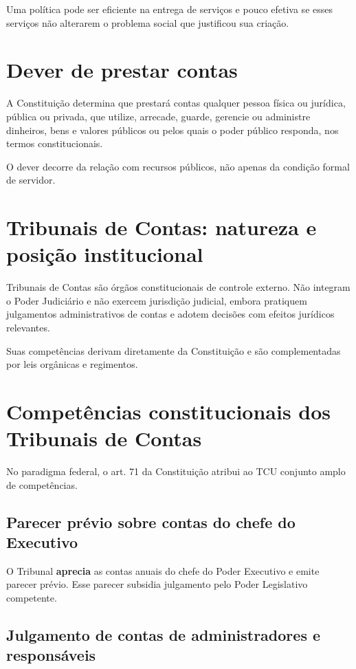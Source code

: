 Uma política pode ser eficiente na entrega de serviços e pouco efetiva se esses serviços não alterarem o problema social que justificou sua criação.

\section{Dever de prestar contas}

A Constituição determina que prestará contas qualquer pessoa física ou jurídica, pública ou privada, que utilize, arrecade, guarde, gerencie ou administre dinheiros, bens e valores públicos ou pelos quais o poder público responda, nos termos constitucionais.

O dever decorre da relação com recursos públicos, não apenas da condição formal de servidor.

\section{Tribunais de Contas: natureza e posição institucional}

Tribunais de Contas são órgãos constitucionais de controle externo. Não integram o Poder Judiciário e não exercem jurisdição judicial, embora pratiquem julgamentos administrativos de contas e adotem decisões com efeitos jurídicos relevantes.

Suas competências derivam diretamente da Constituição e são complementadas por leis orgânicas e regimentos.

\section{Competências constitucionais dos Tribunais de Contas}

No paradigma federal, o art. 71 da Constituição atribui ao TCU conjunto amplo de competências.

\subsection{Parecer prévio sobre contas do chefe do Executivo}

O Tribunal \textbf{aprecia} as contas anuais do chefe do Poder Executivo e emite parecer prévio. Esse parecer subsidia julgamento pelo Poder Legislativo competente.

\subsection{Julgamento de contas de administradores e responsáveis}

